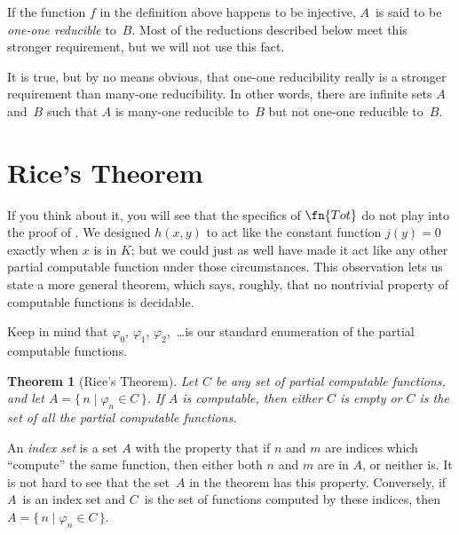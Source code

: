 \documentclass[10pt,a4paper]{article}
\makeatletter
\theoremstyle{plain}
\newtheorem{thm}{Theorem}[section]
\theoremstyle{definition}
\theoremstyle{remark}
\newenvironment{digress}{}{}
\newcommand*{\olfileid}[3]{}
\newcommand*{\olsection}[1]{\section*{#1}}
\newcommand{\olref}{\@ifnextchar[{\olref@i}{\olref@final}}
\def\olref@i[#1]{\@ifnextchar[{\olref@ii}{\olref@final}}
\def\olref@ii[#1]{\@ifnextchar[{\olref@iii}{\olref@final}}
\def\olref@iii[#1]{\olref@final}
\def\olref@final#1{\ref{#1}}
\providecommand{\cfind}[1]{\varphi_{#1}}
\providecommand{\Setabs}[2]{\{\, #1 \mid #2 \,\}}
\makeatother
\begin{document}
If the function $f$ in the definition above happens to be injective,
$A$~is said to be \emph{one-one reducible} to~$B$. Most of the
reductions described below meet this stronger requirement, but we will
not use this fact.

\begin{digress}
It is true, but by no means obvious, that one-one reducibility really
is a stronger requirement than many-one reducibility. In other words,
there are infinite sets $A$ and~$B$ such that $A$ is many-one
reducible to~$B$ but not one-one reducible to~$B$.
\end{digress}





\olfileid{cmp}{thy}{rce}
\olsection{Rice's Theorem}

If you think about it, you will see that the specifics of $\fn{Tot}$
do not play into the proof of \olref[tot]{prop:total}. We designed
$h(x,y)$ to act like the constant function $j(y) = 0$ exactly when $x$
is in $K$; but we could just as well have made it act like any other
partial computable function under those circumstances. This
observation lets us state a more general theorem, which says, roughly,
that no nontrivial property of computable functions is decidable.

Keep in mind that $\cfind{0}$, $\cfind{1}$, $\cfind{2}$,~\dots is our
standard enumeration of the partial computable functions.

\begin{thm}[Rice's Theorem]
  Let $C$ be any set of partial computable functions, and let $A =
  \Setabs{n}{\cfind{n} \in C}$. If $A$ is computable, then either $C$
  is empty or $C$ is the set of all the partial computable
  functions.
\end{thm}

An {\em index set} is a set $A$ with the property that if $n$ and $m$
are indices which ``compute'' the same function, then either both $n$
and $m$ are in $A$, or neither is. It is not hard to see that the
set~$A$ in the theorem has this property. Conversely, if $A$~is an
index set and $C$~is the set of functions computed by these indices,
then $A = \Setabs{n}{\cfind{n} \in C}$.
\end{document}
